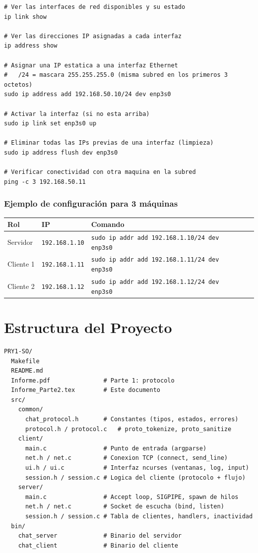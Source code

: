 \documentclass[12pt,a4paper]{article}
\begin{document}
\begin{lstlisting}[style=protocol,caption={Configuración de red para la demo}]
# Ver las interfaces de red disponibles y su estado
ip link show

# Ver las direcciones IP asignadas a cada interfaz
ip address show

# Asignar una IP estatica a una interfaz Ethernet
#   /24 = mascara 255.255.255.0 (misma subred en los primeros 3 octetos)
sudo ip address add 192.168.50.10/24 dev enp3s0

# Activar la interfaz (si no esta arriba)
sudo ip link set enp3s0 up

# Eliminar todas las IPs previas de una interfaz (limpieza)
sudo ip address flush dev enp3s0

# Verificar conectividad con otra maquina en la subred
ping -c 3 192.168.50.11
\end{lstlisting}

\subsubsection{Ejemplo de configuración para 3 máquinas}

\begin{center}
\begin{tabular}{llll}
\toprule
\textbf{Rol} & \textbf{IP} & \textbf{Comando} \\
\midrule
Servidor & \texttt{192.168.1.10} & \texttt{sudo ip addr add 192.168.1.10/24 dev enp3s0} \\
Cliente 1 & \texttt{192.168.1.11} & \texttt{sudo ip addr add 192.168.1.11/24 dev enp3s0} \\
Cliente 2 & \texttt{192.168.1.12} & \texttt{sudo ip addr add 192.168.1.12/24 dev enp3s0} \\
\bottomrule
\end{tabular}
\end{center}

\section{Estructura del Proyecto}

\begin{lstlisting}[style=protocol,caption={Árbol de archivos del proyecto}]
PRY1-SO/
  Makefile
  README.md
  Informe.pdf               # Parte 1: protocolo
  Informe_Parte2.tex        # Este documento
  src/
    common/
      chat_protocol.h       # Constantes (tipos, estados, errores)
      protocol.h / protocol.c   # proto_tokenize, proto_sanitize
    client/
      main.c                # Punto de entrada (argparse)
      net.h / net.c         # Conexion TCP (connect, send_line)
      ui.h / ui.c           # Interfaz ncurses (ventanas, log, input)
      session.h / session.c # Logica del cliente (protocolo + flujo)
    server/
      main.c                # Accept loop, SIGPIPE, spawn de hilos
      net.h / net.c         # Socket de escucha (bind, listen)
      session.h / session.c # Tabla de clientes, handlers, inactividad
  bin/
    chat_server             # Binario del servidor
    chat_client             # Binario del cliente
\end{lstlisting}
\end{document}
